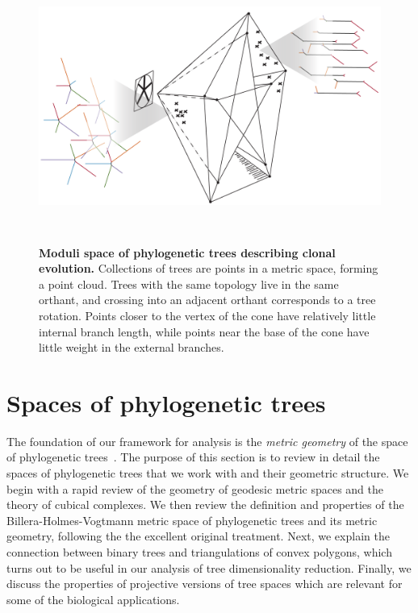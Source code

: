 \documentclass[a4paper,11pt]{article}
\begin{document}
\begin{figure}
    \centering
    \includegraphics[height=3.5in]{../figures/illustration_BHV_5.png}
    \caption{{\bf Moduli space of phylogenetic trees describing clonal evolution.} Collections of trees are points in a metric space, forming a point cloud. Trees with the same topology live in the same orthant, and crossing into an adjacent orthant corresponds to a tree rotation. Points closer to the vertex of the cone have relatively little internal branch length, while points near the base of the cone have little weight in the external branches.}
    \label{fig:illustration_2}
\end{figure}



\section{Spaces of phylogenetic trees}\label{sec:phylospace}

The foundation of our framework for analysis is the {\em metric geometry} of the space of phylogenetic trees~\cite{billera2001geometry}.
The purpose of this section is to review in detail the spaces of phylogenetic trees that we work with and their geometric structure.
We begin with a rapid review of the geometry of geodesic metric spaces and the theory of cubical complexes.
We then review the definition and properties of the Billera-Holmes-Vogtmann metric space of phylogenetic trees and its metric geometry, following the the excellent original treatment.
Next, we explain the connection between binary trees and triangulations of convex polygons, which turns out to be useful in our analysis of tree dimensionality reduction.
Finally, we discuss the properties of projective versions of tree spaces which are relevant for some of the biological applications.
\end{document}
